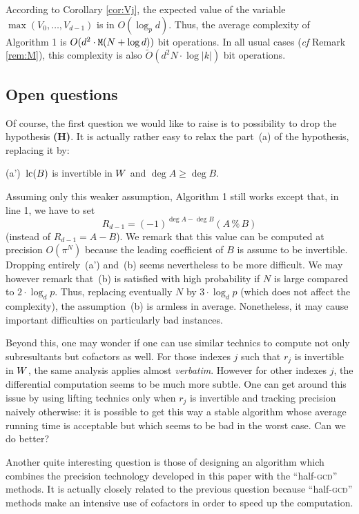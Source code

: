 \documentclass{sig-alternate}
\begin{document}
According to Corollary \ref{cor:Vj}, the expected value of the variable 
$\max(V_0, \ldots, V_{d-1})$ is in $O(\log_p d)$. Thus, the average 
complexity of Algorithm 1 is $O(d^2 \cdot \text{\tt M}(N + \log d))$ bit 
operations. In all usual cases (\emph{cf} Remark \ref{rem:M}), this
complexity is also $\tilde O(d^2 N \cdot \log |k|)$ bit operations.

\subsection{Open questions}
\label{subsec:questions}

Of course, the first question we would like to raise is to possibility 
to drop the hypothesis {\bf (H)}. It is actually rather easy to relax
the part~(a) of the hypothesis, replacing it by:

\medskip

(a')~$\text{\rm lc}(B)$ is invertible in $W$ and $\deg A \geq \deg B$.

\medskip

\noindent
Assuming only this weaker assumption, Algorithm 1 still works except 
that, in line 1, we have to set
$$R_{d-1} = (-1)^{\deg A - \deg B} (A \,\%\, B)$$
(instead of $R_{d-1} = A-B$).
We remark that this value can be computed at precision $O(\pi^N)$
because the leading coefficient of $B$ is assume to be invertible.
Dropping entirely~(a') and~(b) seems nevertheless to be more difficult. 
We may however remark that~(b) is satisfied with high probability if
$N$ is large compared to $2 \cdot \log_d p$. Thus, replacing eventually
$N$ by $3 \cdot \log_d p$ (which does not affect the complexity), the 
assumption~(b) is armless in average. Nonetheless, it may cause
important difficulties on particularly bad instances.

Beyond this, one may wonder if one can use similar technics to compute 
not only subresultants but cofactors as well. For those indexes $j$ such 
that $r_j$ is invertible in $W$, the same analysis applies almost 
\emph{verbatim}. However for other indexes $j$, the differential 
computation seems to be much more subtle. One can get around this issue 
by using lifting technics only when $r_j$ is invertible and tracking 
precision naively otherwise: it is possible to get this way a stable 
algorithm whose average running time is acceptable but which seems to be 
bad in the worst case. Can we do better?

Another quite interesting question is those of designing an algorithm 
which combines the precision technology developed in this paper with the 
``half-\textsc{gcd}'' methods. It is actually closely related to the 
previous question because ``half-\textsc{gcd}'' methods make an 
intensive use of cofactors in order to speed up the computation.
\end{document}
